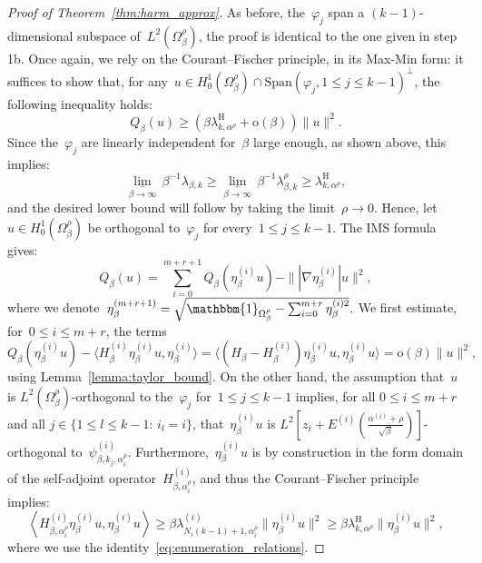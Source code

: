 \documentclass[10pt]{article}
\newcommand{\1}{\mathbbm 1}
\newcommand{\epsLimit}[1]{\alpha^{(#1)}} %
\newcommand{\halfSpace}[1]{E^{(#1)}}
\newcommand{\shift}{\rho} %
\renewcommand{\o}{\mathrm{o}}
\begin{document}
\begin{proof}[Proof of Theorem~\ref{thm:harm_approx}]
        As before, the~$\varphi_j$ span a $(k-1)$-dimensional subspace of~$L^2(\Omega_\beta^\shift)$, the proof is identical to the one given in step 1b.
        Once again, we rely on the Courant--Fischer principle, in its Max-Min form: it suffices to show that, for any~$u \in H_0^1(\Omega_\beta^\shift)\cap\mathrm{Span}(\varphi_j, 1\leq j \leq k-1)^\perp$, the following inequality holds:
       ~$$ Q_\beta(u) \geq (\beta\lambda_{k,\alpha^\shift}^{\mathrm{H}} + \o(\beta))\|u\|^2.$$
        Since the~$\varphi_j$ are linearly independent for~$\beta$ large enough, as shown above, this implies:
        \[\underset{\beta\to\infty}{\underline\lim}\,\beta^{-1}\lambda_{\beta,k}\geq\underset{\beta\to\infty}{\underline\lim}\,\beta^{-1}\lambda^\shift_{\beta,k}\geq \lambda_{k,\alpha^\shift}^{\mathrm{H}},\]
        and the desired lower bound will follow by taking the limit~$\shift\to 0$.
        Hence, let~$u\in H_0^1(\Omega_\beta^\shift)$ be orthogonal to~$\varphi_j$ for every~$1\leq j \leq k-1$. The IMS formula gives:
        \[Q_\beta(u) = \sum_{i=0}^{m+r+1} Q_\beta(\eta_\beta^{(i)}u) - \||\nabla \eta_\beta^{(i)}|u\|^2,\]
        where we denote~$\eta_\beta^{(m+r+1)} = \sqrt{\mathbbm{1}_{\Omega_\beta^\shift}-\sum_{i=0}^{m+r}\eta_\beta^{(i)2}}.$
        We first estimate, for~$0\leq i \leq m+r$, the terms
        \begin{equation}
            Q_\beta(\eta_\beta^{(i)}u)-\langle H_\beta^{(i)}\eta_\beta^{(i)}u,\eta_\beta^{(i)}\rangle = \langle (H_\beta-H_\beta^{(i)})\eta_\beta^{(i)}u,\eta_\beta^{(i)}u\rangle = \mathrm o(\beta)\|u\|^2,
        \end{equation}
        using Lemma~\ref{lemma:taylor_bound}.
        On the other hand, the assumption that~$u$ is $L^2(\Omega_\beta^\shift)$-orthogonal to the~$\varphi_j$ for~$1\leq j \leq k-1$ implies, for all $0\leq i\leq m+r$ and all $j \in \{1\leq l\leq k-1:\,i_l =i \}$, that~$\eta_\beta^{(i)}u$ is $L^2\left[z_{i} + \halfSpace{i}\left(\frac{\epsLimit{i}+\shift}{\sqrt\beta}\right)\right]$-orthogonal to~$\psi_{\beta,k_j,\alpha_{i}^\shift}^{(i)}$.
        Furthermore,~$\eta_\beta^{(i)}u$ is by construction in the form domain of the self-adjoint operator~$H_{\beta,\alpha^\shift_{i}}^{(i)}$, and thus the Courant--Fischer principle implies:
        \begin{equation}
            \left\langle H_{\beta,\alpha^\shift_{i}}^{(i)}\eta_\beta^{(i)}u,\eta_\beta^{(i)}u\right\rangle \geq \beta\lambda_{N_i(k-1)+1,\alpha^\shift_{i}}^{(i)}\|\eta_\beta^{(i)}u\|^2\geq \beta \lambda_{k,\alpha^\shift}^{\mathrm H}\|\eta_\beta^{(i)}u\|^2,
        \end{equation}
        where we use the identity~\eqref{eq:enumeration_relations}.


\end{proof}
\end{document}

